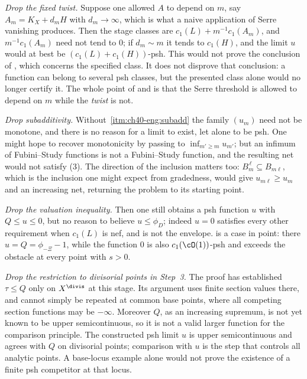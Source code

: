 \emph{Drop the fixed twist.}  Suppose one allowed $A$ to depend on $m$,
say $A_m=K_X+d_mH$ with $d_m\to\infty$, which is what a naive
application of Serre vanishing produces.  Then the stage classes are
$c_1(L)+m^{-1}c_1(A_m)$, and $m^{-1}c_1(A_m)$ need not tend to $0$;
if $d_m\sim m$ it tends to $c_1(H)$, and the limit $u$ would at best
be $(c_1(L)+c_1(H))$-psh.  This would not prove the conclusion of
, which concerns the specified class.
It does not disprove that conclusion: a function can belong to several
psh classes, but the presented class alone would no longer certify it.  The whole point of
 and
 is that the Serre threshold is
allowed to depend on $m$ while the \emph{twist} is not.

\emph{Drop subadditivity.}  Without
\,\cref{itm:ch40-eng:subadd} the family
$(u_m)$ need not be monotone, and there is no reason for a limit to exist,
let alone to be psh.  One might hope to recover monotonicity by passing to
$\inf_{m'\ge m}u_{m'}$; but an infimum of Fubini--Study functions is not a
Fubini--Study function, and the resulting net would not satisfy
(3).  The direction of the inclusion matters too:
$B_m^{\,\ell}\subseteq B_{m\ell}$, which is the inclusion one might expect
from gradedness, would give $u_{m\ell}\ge u_m$ and an increasing net,
returning the problem to its starting point.

\emph{Drop the valuation inequality.}  Then one still obtains a psh function
$u$ with $Q\le u\le0$, but no reason to believe $u\le\phi_D$; indeed
$u=0$ satisfies every other requirement when $c_1(L)$ is nef, and is not
the envelope.   is a case in point: there
$u=Q=\phi_{-\Xi}-1$, while the function $0$ is also
$c_1(\cO(1))$-psh and exceeds the obstacle at every point with $s>0$.

\emph{Drop the restriction to divisorial points in Step~3.}  The proof has established
$\tau\le Q$ only on $X^{\divis}$ at this stage.  Its argument uses
finite section values there, and cannot simply be repeated at common
base points, where all competing section functions may be $-\infty$.
Moreover $Q$, as an increasing supremum, is not yet known to be upper
semicontinuous, so it is not a valid larger function for the comparison
principle.  The constructed psh limit $u$ is upper semicontinuous and
agrees with $Q$ on divisorial points; comparison with $u$ is the step
that controls all analytic points.  A base-locus example alone would not
prove the existence of a finite psh competitor at that locus.

